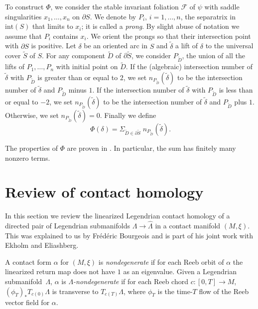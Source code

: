 \documentclass[JEP,XML,SOM,Unicode,NoFloatCountersInSection]{cedram}
\let\mathcal\mathscr
\let\ra\rightarrow
\newcommand{\inte}{\mathrm{int}}
\theoremstyle{plain}
\theoremstyle{definition}
\numberwithin{equation}{subsection}
\newcommand{\cF}{\mathcal{F}}
\begin{document}
To construct $\Phi$, we consider the stable invariant foliation $\cF$ of $\psi$ with saddle singularities $x_1,\dots,x_n$ on $\partial S$. We denote by $P_i$, $i=1,\dots, n$, the separatrix in $\inte(S)$ that limits to $x_i$; it is called a {\em prong}. By slight abuse of notation we assume that $P_i$ contains $x_i$. We orient the prongs so that their intersection point with $\partial S$ is positive. Let $\delta$ be an oriented arc in $S$ and $\widetilde{\delta}$ a lift of $\delta$ to the universal cover $\widetilde{S}$ of $S$. For any component $\widetilde{D}$ of $\partial \widetilde{S}$, we consider $P_{\widetilde{D}}$, the union of all the lifts of $P_1,\dots,P_n$ with initial point on $\widetilde{D}$. If the (algebraic) intersection number of $\widetilde{\delta}$ with $P_{\widetilde{D}}$ is greater than or equal to $2$, we set $n_{P_{\widetilde{D}}} (\widetilde{\delta})$ to be the intersection number of $\widetilde{\delta}$ and $P_{\widetilde{D}}$ minus $1$. If the intersection number of $\widetilde{\delta}$ with $P_{\widetilde{D}}$ is less than or equal to $-2$, we set $n_{P_{\widetilde{D}}} (\widetilde{\delta})$ to be the intersection number of $\widetilde{\delta}$ and $P_{\widetilde{D}}$ plus $1$. Otherwise, we set $n_{P_{\widetilde{D}}} (\widetilde{\delta})=0$. Finally we define
\begin{equation} \label{eqn: defn of phi}
\Phi (\delta)=\Sigma_{\widetilde{D} \in \partial \widetilde{S}}\; n_{P_{\widetilde{D}}} (\widetilde{\delta}).
\end{equation}

The properties of $\Phi$ are proven in \cite{CH2}. In particular, the sum has finitely many nonzero terms.

\section{Review of contact homology} \label{section: review of contact homology}

In this section we review the linearized Legendrian contact homology of a directed pair of Legendrian submanifolds $\Lambda\ra\widehat{\Lambda}$ in a contact manifold $(M,\xi)$. This was explained to us by Frédéric Bourgeois and is part of his joint work \cite{BEE} with Ekholm and Eliashberg.

A contact form $\alpha$ for $(M,\xi)$ is {\em nondegenerate} if for each Reeb orbit of $\alpha$ the linearized return map does not have $1$ as an eigenvalue. Given a Legendrian submanifold~$\Lambda$, $\alpha$ is {\em $\Lambda$-nondegenerate} if for each Reeb chord $c: [0,T]\to M$, $(\phi_T)_*T_{c(0)}\Lambda$ is transverse to $T_{c(T)}\Lambda$, where $\phi_T$ is the time-$T$ flow of the Reeb vector field for $\alpha$.
\end{document}
